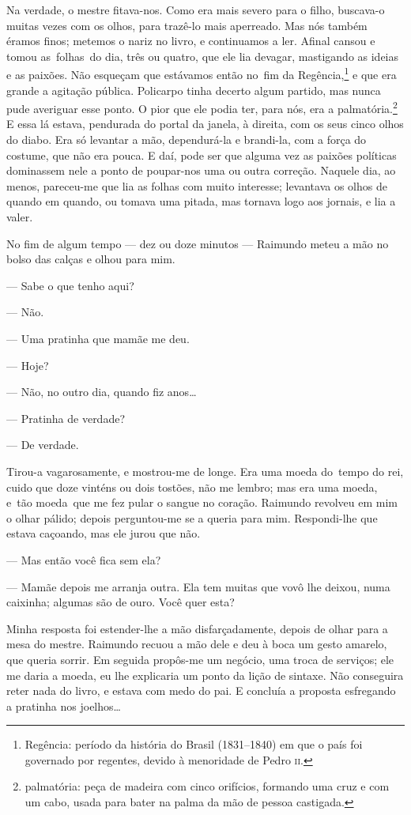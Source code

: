 Na verdade, o mestre fitava-nos. Como era mais severo para o filho,
buscava-o muitas vezes com os olhos, para trazê-lo mais aperreado. Mas
nós também éramos finos; metemos o nariz no livro, e continuamos a ler.
Afinal cansou e tomou as~folhas~do dia, três ou quatro, que ele lia
devagar, mastigando as ideias e as paixões. Não esqueçam que estávamos
então no~fim da Regência,\footnote{Regência: período da história do
  Brasil (1831--1840) em que o país foi governado por regentes, devido à
  menoridade de Pedro \textsc{ii}.} e que era grande a agitação pública.
Policarpo tinha decerto algum partido, mas nunca pude averiguar esse
ponto. O pior que ele podia ter, para nós, era a palmatória.\footnote{palmatória:
  peça de madeira com cinco orifícios, formando uma cruz e com um cabo,
  usada para bater na palma da mão de pessoa castigada.} E essa lá
estava, pendurada do portal da janela, à direita, com os seus cinco
olhos do diabo. Era só levantar a mão, dependurá-la e brandi-la, com a
força do costume, que não era pouca. E daí, pode ser que alguma vez as
paixões políticas dominassem nele a ponto de poupar-nos uma ou outra
correção. Naquele dia, ao menos, pareceu-me que lia as folhas com muito
interesse; levantava os olhos de quando em quando, ou tomava uma pitada,
mas tornava logo aos jornais, e lia a valer.

No fim de algum tempo --- dez ou doze minutos --- Raimundo meteu a mão
no bolso das calças e olhou para mim.

--- Sabe o que tenho aqui?

--- Não.

--- Uma pratinha que mamãe me deu.

--- Hoje?

--- Não, no outro dia, quando fiz anos\ldots{}

--- Pratinha de verdade?

--- De verdade.

Tirou-a vagarosamente, e mostrou-me de longe. Era uma moeda do~tempo do
rei, cuido que doze vinténs ou dois tostões, não me lembro; mas era uma
moeda, e~tão moeda~que me fez pular o sangue no coração. Raimundo
revolveu em mim o olhar pálido; depois perguntou-me se a queria para
mim. Respondi-lhe que estava caçoando, mas ele jurou que não.

--- Mas então você fica sem ela?

--- Mamãe depois me arranja outra. Ela tem muitas que vovô lhe deixou,
numa caixinha; algumas são de ouro. Você quer esta?

Minha resposta foi estender-lhe a mão disfarçadamente, depois de olhar
para a mesa do mestre. Raimundo recuou a mão dele e deu à boca um gesto
amarelo, que queria sorrir. Em seguida propôs-me um negócio, uma troca
de serviços; ele me daria a moeda, eu lhe explicaria um ponto da lição
de sintaxe. Não conseguira reter nada do livro, e estava com medo do
pai. E concluía a proposta esfregando a pratinha nos joelhos\ldots{}

